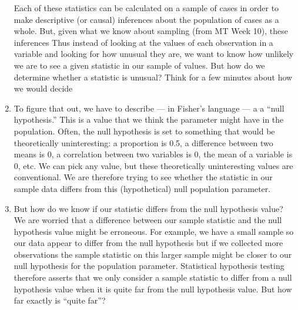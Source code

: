\documentclass[a4paper,12pt]{article}
\begin{document}
\begin{enumerate}
Each of these statistics can be calculated on a sample of cases in order to make descriptive (or causal) inferences about the population of cases as a whole. But, given what we know about sampling (from MT Week 10), these inferences
 Thus instead of looking at the values of each observation in a variable and looking for how unusual they are, we want to know how unlikely we are to see a given statistic in our sample of values. But how do we determine whether a statistic is unusual? Think for a few minutes about how we would decide



\item To figure that out, we have to describe --- in Fisher's language --- a a ``null hypothesis.'' This is a value that we think the parameter might have in the population. Often, the null hypothesis is set to something that would be theoretically uninteresting: a proportion is 0.5, a difference between two means is 0, a correlation between two variables is 0, the mean of a variable is 0, etc. We can pick any value, but these theoretically uninteresting values are conventional. We are therefore trying to see whether the statistic in our sample data differs from this (hypothetical) null population parameter.

\item But how do we know if our statistic differs from the null hypothesis value? We are worried that a difference between our sample statistic and the null hypothesis value might be erroneous. For example, we have a small sample so our data appear to differ from the null hypothesis but if we collected more observations the sample statistic on this larger sample might be closer to our null hypothesis for the population parameter. Statistical hypothesis testing therefore asserts that we only consider a sample statistic to differ from a null hypothesis value when it is quite far from the null hypothesis value. But how far exactly is ``quite far''?


\end{enumerate}
\end{document}
